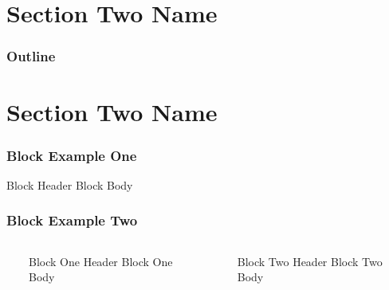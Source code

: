 \documentclass{beamer}
\begin{document}
\section{Section Two Name}
\begin{frame} 
\frametitle{Outline} \tableofcontents[currentsection]
\end{frame}

\section{Section Two Name} 

\begin{frame}
\frametitle{Block Example One}
\begin{block}{Block Header}
	Block Body
\end{block}
\end{frame}

\begin{frame}
\frametitle{Block Example Two}
\begin{columns}
  \ 
	\begin{block}{Block One Header} 
		Block One Body 
	\end{block} 
 \ 
	\begin{block}{Block Two Header} 
		Block Two Body
	\end{block} 
\end{columns}
\end{frame}
\end{document}

